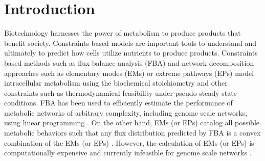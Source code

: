 \documentclass[10pt,twocolumn,twoside,final]{IEEEtran}
\begin{document}
\section{Introduction}

Biotechnology harnesses the power of metabolism to produce products that benefit society.
Constraints based models are important tools to understand and ultimately to predict how cells utilize nutrients to produce products.
Constraints based methods such as flux balance analysis (FBA) \cite{2010_orth_NatBiotech} and network decomposition approaches such as elementary modes (EMs) \cite{Schuster:2000aa}
or extreme pathways (EPs) \cite{Schilling:2000aa}
model intracellular metabolism using the biochemical stoichiometry and other constraints such as thermodynamical feasibility under pseudo-steady state conditions.
FBA has been used to efficiently estimate the performance of metabolic networks of arbitrary complexity, including genome scale networks, using linear programming  \cite{Covert:2004aa}.
On the other hand, EMs (or EPs) catalog all possible metabolic behaviors such that any flux distribution predicted by FBA is a convex combination
of the EMs (or EPs) \cite{Wiback:2003aa}.
However, the calculation of EMs (or EPs) is computationally expensive and currently infeasible for genome scale networks \cite{2004_lee_varner_ko_ieee}.
\end{document}
